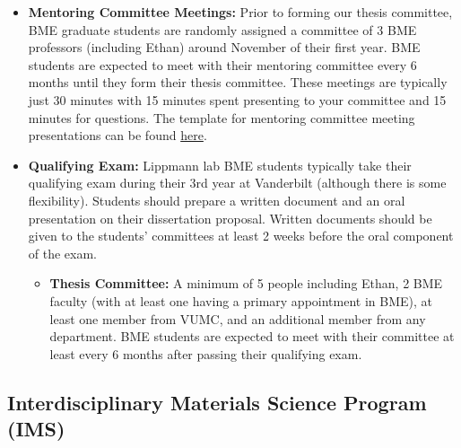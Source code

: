 \documentclass[
]{book}
\providecommand{\tightlist}{%
  \setlength{\itemsep}{0pt}\setlength{\parskip}{0pt}}
\begin{document}
\begin{itemize}
\item
  \textbf{Mentoring Committee Meetings:} Prior to forming our thesis committee, BME graduate students are randomly assigned a committee of 3 BME professors (including Ethan) around November of their first year. BME students are expected to meet with their mentoring committee every 6 months until they form their thesis committee. These meetings are typically just 30 minutes with 15 minutes spent presenting to your committee and 15 minutes for questions. The template for mentoring committee meeting presentations can be found \href{}{here}.
\item
  \textbf{Qualifying Exam:} Lippmann lab BME students typically take their qualifying exam during their 3rd year at Vanderbilt (although there is some flexibility). Students should prepare a written document and an oral presentation on their dissertation proposal. Written documents should be given to the students' committees at least 2 weeks before the oral component of the exam.

  \begin{itemize}
  \tightlist
  \item
    \textbf{Thesis Committee:} A minimum of 5 people including Ethan, 2 BME faculty (with at least one having a primary appointment in BME), at least one member from VUMC, and an additional member from any department. BME students are expected to meet with their committee at least every 6 months after passing their qualifying exam.
  \end{itemize}
\end{itemize}

\hypertarget{ims}{%
\subsection{Interdisciplinary Materials Science Program (IMS)}\label{ims}}
\end{document}
